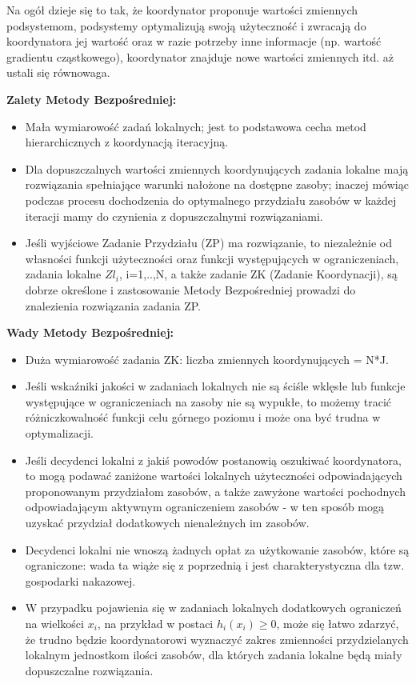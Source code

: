 Na ogół dzieje się to tak, że koordynator proponuje wartości
zmiennych podsystemom, podsystemy optymalizują swoją użyteczność i zwracają do koordynatora jej wartość oraz w razie potrzeby inne informacje (np. wartość gradientu cząstkowego), koordynator znajduje nowe wartości zmiennych itd. aż ustali się równowaga.

\textbf{Zalety Metody Bezpośredniej:}
\begin{itemize}
    \item Mała wymiarowość zadań lokalnych; jest to podstawowa cecha metod hierarchicznych z koordynacją iteracyjną.
    \item Dla dopuszczalnych wartości zmiennych koordynujących zadania lokalne mają rozwiązania spełniające warunki nałożone na dostępne zasoby; inaczej mówiąc podczas procesu dochodzenia do optymalnego przydziału zasobów w każdej iteracji mamy do czynienia z dopuszczalnymi rozwiązaniami.
    \item Jeśli wyjściowe Zadanie Przydziału (ZP) ma rozwiązanie, to niezależnie od własności funkcji użyteczności oraz funkcji występujących w ograniczeniach, zadania lokalne $Zl_i$, i=1,..,N, a także zadanie ZK (Zadanie Koordynacji), są dobrze określone i zastosowanie Metody Bezpośredniej prowadzi do znalezienia rozwiązania zadania ZP.
\end{itemize}

\textbf{Wady Metody Bezpośredniej:}
\begin{itemize}
    \item Duża wymiarowość zadania ZK: liczba zmiennych koordynujących = N*J.
    \item Jeśli wskaźniki jakości w zadaniach lokalnych nie są ściśle wklęsłe lub funkcje występujące w ograniczeniach na zasoby nie są wypukłe, to możemy tracić różniczkowalność funkcji celu górnego poziomu i może ona być trudna w optymalizacji.
    \item Jeśli decydenci lokalni z jakiś powodów postanowią oszukiwać koordynatora, to mogą podawać zaniżone wartości lokalnych użyteczności odpowiadających proponowanym przydziałom zasobów, a także zawyżone wartości pochodnych odpowiadającym aktywnym ograniczeniem zasobów - w ten sposób mogą uzyskać przydział dodatkowych nienależnych im zasobów.
    \item Decydenci lokalni nie wnoszą żadnych opłat za użytkowanie zasobów, które są ograniczone: wada ta wiąże się z poprzednią i jest charakterystyczna dla tzw. gospodarki nakazowej.
    \item W przypadku pojawienia się w zadaniach lokalnych dodatkowych ograniczeń na wielkości $x_i$, na przykład w postaci $h_i(x_i)\geq 0$, może się łatwo zdarzyć, że trudno będzie koordynatorowi wyznaczyć zakres zmienności przydzielanych lokalnym jednostkom ilości zasobów, dla których zadania lokalne będą miały dopuszczalne rozwiązania.
\end{itemize}

